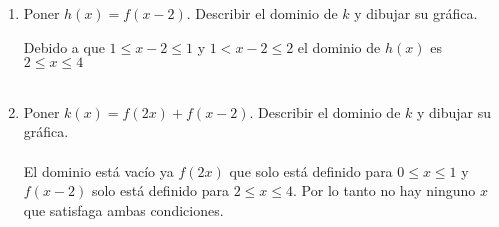 \begin{enumerate}
\begin{enumerate}[\bfseries (a)]
                \item Poner $h(x) = f(x-2).$ Describir el dominio de $k$ \; y dibujar su gráfica.
                    \begin{center}
                    \end{center}
                Debido a que $1\leq x-2 \leq 1$ \; y \; $1 < x-2 \leq 2$ el dominio de $h(x)$ es $2\leq x \leq 4$\\\\ 

                \item Poner $k(x) = f(2x) + f(x-2).$ Describir el dominio de $k$ \; y dibujar su gráfica.\\\\
                El dominio está vacío ya $f(2x)$ que solo está definido para $0 \leq x \leq 1$ \; y \;  $f(x-2)$ solo está definido para $2 \leq x \leq 4$. Por lo tanto no hay ninguno $x$ que satisfaga ambas condiciones. \\\\
            \end{enumerate}
        

\end{enumerate}

